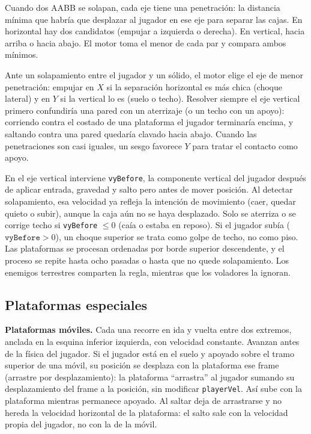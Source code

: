 Cuando dos AABB se solapan, cada eje tiene una penetración: la
distancia mínima que habría que desplazar al jugador en ese eje para separar las
cajas. En horizontal hay dos candidatos (empujar a izquierda o derecha). En
vertical, hacia arriba o hacia abajo. El motor toma el menor de cada par y compara
ambos mínimos.

Ante un solapamiento entre el jugador y un sólido, el motor elige el eje de menor
penetración: empujar en $X$ si la separación horizontal es más chica (choque lateral) y
en $Y$ si la vertical lo es (suelo o techo). Resolver siempre el eje vertical primero
confundiría una pared con un aterrizaje (o un techo con un apoyo): corriendo
contra el costado de una plataforma el jugador terminaría encima, y saltando contra
una pared quedaría clavado hacia abajo. Cuando las penetraciones son casi iguales,
un sesgo favorece $Y$ para tratar el contacto como apoyo.

En el eje vertical interviene \texttt{vyBefore}, la componente vertical del jugador
después de aplicar entrada, gravedad y salto pero antes de mover
posición. Al detectar solapamiento, esa velocidad ya refleja la intención de
movimiento (caer, quedar quieto o subir), aunque la caja aún no se haya
desplazado. Solo se aterriza o se corrige techo si \texttt{vyBefore} $\leq 0$ (caía o
estaba en reposo). Si el jugador subía ($\texttt{vyBefore} > 0$), un choque superior se
trata como golpe de techo, no como piso. Las plataformas se procesan ordenadas por
borde superior descendente, y el proceso se repite hasta ocho pasadas o hasta que no
quede solapamiento. Los enemigos terrestres comparten la regla, mientras que los
voladores la ignoran.

\subsection{Plataformas especiales}
\label{subsec:plataformas-especiales}

\textbf{Plataformas móviles.} Cada una recorre en ida y vuelta entre dos extremos,
anclada en la esquina inferior izquierda, con velocidad constante. Avanzan antes de la
física del jugador. Si el jugador está en el suelo y apoyado sobre el tramo superior
de una móvil, su posición se desplaza con la plataforma ese frame
(arrastre por desplazamiento): la plataforma ``arrastra'' al jugador sumando su
desplazamiento del frame a la posición, sin modificar \texttt{playerVel}. Así
sube con la plataforma mientras permanece apoyado. Al saltar deja de arrastrarse y
no hereda la velocidad horizontal de la plataforma: el salto sale con la velocidad
propia del jugador, no con la de la móvil.

